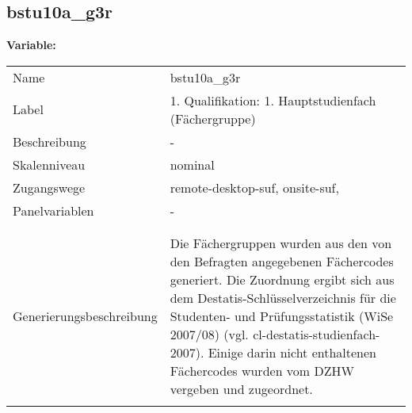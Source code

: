 	
	
	\subsection{bstu10a\_g3r}
	\label{subSection:bstu10a_g3r}

	\noindent\textbf{Variable:}\\
		\begin{tabular}{lL{11.3cm}}
			\label{tableVariable:bstu10a_g3r}
			Name & bstu10a\_g3r \\
			Label & 1. Qualifikation: 1. Hauptstudienfach (Fächergruppe) \\
			Beschreibung & - \\
			Skalenniveau & nominal \\
			Zugangswege &
				remote-desktop-suf,
				onsite-suf,
 \\
			Panelvariablen & -
			 \\
			 \\
 \\
					Generierungsbeschreibung & Die Fächergruppen wurden aus den von den Befragten angegebenen Fächercodes generiert. Die Zuordnung ergibt sich aus dem Destatis-Schlüsselverzeichnis für die Studenten- und Prüfungsstatistik (WiSe 2007/08) (vgl. cl-destatis-studienfach-2007).  Einige darin nicht enthaltenen Fächercodes wurden vom DZHW vergeben und zugeordnet. 
				 \\	
			 \\
		\end{tabular}






